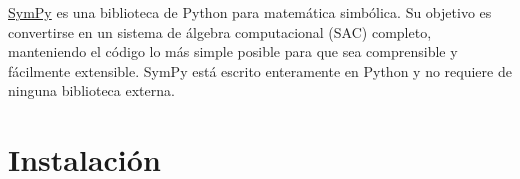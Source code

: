 \href{http://www.sympy.org/}{SymPy}
es una biblioteca de Python para matemática simbólica. Su objetivo es convertirse en 
un sistema de álgebra computacional (SAC) completo, manteniendo el código lo más simple 
posible para que sea comprensible y fácilmente extensible. SymPy está escrito enteramente 
en Python y no requiere de ninguna biblioteca externa.
% 
% 


% 
% 
% 
% 


\section{Instalación}


